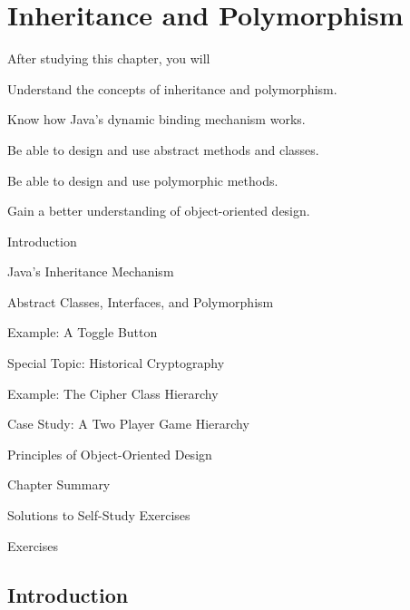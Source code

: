 
\setcounter{SSTUDYcount}{1}
\setcounter{chapter}{7}
\chapter{Inheritance and Polymorphism}
\label{chapter-inheritance}


\CObegin
{}
\label{objectives}
\noindent After studying this chapter, you will
\begin{COBL}
\item  Understand the concepts of inheritance and polymorphism.
\item  Know how Java's dynamic binding mechanism works.
\item  Be able to design and use abstract methods and classes.
\item  Be able to design and use polymorphic methods.
\item  Gain a better understanding of object-oriented design.
\end{COBL}

\label{outline}
\begin{COL}
\item Introduction
\item Java's Inheritance Mechanism
\item Abstract Classes, Interfaces, and Polymorphism
\item Example: A Toggle Button
\item[] {{\color{cyan}Special Topic:} Historical Cryptography}
\item Example: The Cipher Class Hierarchy
\item Case Study: A Two Player Game Hierarchy
\item Principles of Object-Oriented Design
\par\small\item[] Chapter Summary
\par\small\item[] Solutions to Self-Study Exercises
\par\small\item[] Exercises
\end{COL}
\COend

\section{Introduction}
\label{introduction}

